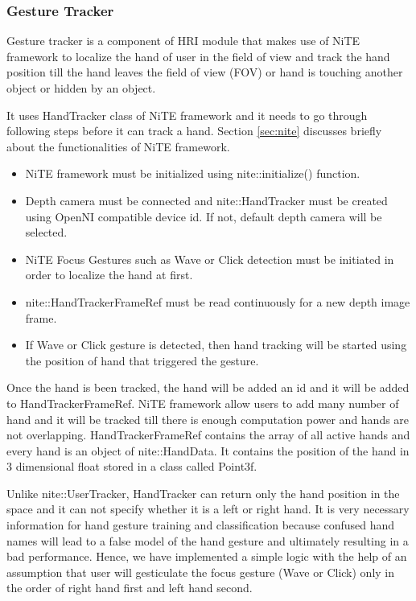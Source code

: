 \subsubsection{Gesture Tracker}
Gesture tracker is a component of HRI module that makes use of NiTE framework to localize the hand of user in the field of view and track the hand position till the hand leaves the field of view (FOV) or hand is touching another object or hidden by an object. 

It uses HandTracker class of NiTE framework and it needs to go through following steps before it can track a hand. Section \ref{sec:nite} discusses briefly about the functionalities of NiTE framework.

\begin{itemize}
	\item NiTE framework must be initialized using nite::initialize() function.
	\item Depth camera must be connected and nite::HandTracker must be created using OpenNI compatible  device id. If not, default depth camera will be selected.
	\item NiTE Focus Gestures such as Wave or Click detection must be initiated in order to localize the hand at first.
	\item nite::HandTrackerFrameRef must be read continuously for a new depth image frame.
	\item If Wave or Click gesture is detected, then hand tracking will be started using the position of hand that triggered the gesture.
\end{itemize}

Once the hand is been tracked, the hand will be added an id and it will be added to HandTrackerFrameRef. NiTE framework allow users to add many number of hand and it will be tracked till there is enough computation power  and hands are not overlapping. HandTrackerFrameRef contains the array of all active hands and every hand is an object of nite::HandData. It contains the position of the hand in 3 dimensional float stored in a class called Point3f.

Unlike nite::UserTracker, HandTracker can return only the hand position in the space and it can not specify whether it is a left or right hand. It is very necessary information for hand gesture training and classification because confused hand names will lead to a false model of the hand gesture and ultimately resulting in a bad performance. Hence, we have implemented a simple logic with the help of an assumption that user will gesticulate the focus gesture (Wave or Click) only in the order of right hand first and left hand second. 

